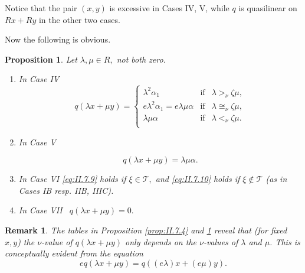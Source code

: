 \documentclass [12pt,a4paper,reqno]{amsart}
\newtheorem{prop}[thm]{Proposition}
\newtheorem{remark}[thm]{Remark}
\begin{document}
Notice that the pair $(x,y)$ is excessive in Cases IV, V, while  $q$ is quasilinear on $R x + R y$ in the other two cases.

Now the following is obvious.

\begin{prop}\label{prop:II.7.7}
Let ${\lambda} , \mu \in R,$
 not both zero.

\begin{enumerate} {{}}
  \item In Case IV
  \begin{equation}\label{eq:II.7.11}
   q({\lambda} x + \mu y ) = \left\{
    \begin{array}{lll}
      {\lambda}^2 {\alpha}_1 & \text{if} &  {\lambda} {>_\nu} {\zeta} \mu,  \\[1mm]
      e {\lambda}^2 {\alpha}_1  = e {\lambda} \mu  {\alpha} & \text{if}  &  {\lambda} {\cong_\nu} {\zeta} \mu , \\[1mm]
       {\lambda} \mu {\alpha}  & \text{if}  & {\lambda} {<_\nu} {\zeta} \mu . \\
    \end{array}
  \right.
  \end{equation} {\vskip 1.5mm \noindent}

  \item In Case V

  \begin{equation} \label{eq:II.7.12} q( {\lambda} x + \mu y )  = {\lambda} \mu {\alpha}.
  \end{equation} {\vskip 1.5mm \noindent}

  \item In Case VI \eqref{eq:II.7.9} holds if ${\xi} \in {\mathcal T},$ and \eqref{eq:II.7.10} holds if ${\xi} \notin {\mathcal T}$  (as in Cases  {{{I}}{{B}}} resp.  {{{II}}{{B}}},  {{{III}}{{C}}}). {\vskip 1.5mm \noindent}

  \item In Case VII \ $q({\lambda} x + \mu y) = 0.$

\end{enumerate}

\end{prop}

\begin{remark}\label{rmk:II.7.8}
The tables in Proposition \ref{prop:II.7.4} and \ref{prop:II.7.7} reveal that (for fixed $x,y$) the $\nu$-value of $q({\lambda} x + \mu y)$ only depends on the $\nu$-values of ${\lambda}$ and $\mu$.
This is conceptually evident from the equation
$$ eq({\lambda} x + \mu y) = q ((e{\lambda})x + (e\mu)y).$$
\end{remark}
\end{document}

